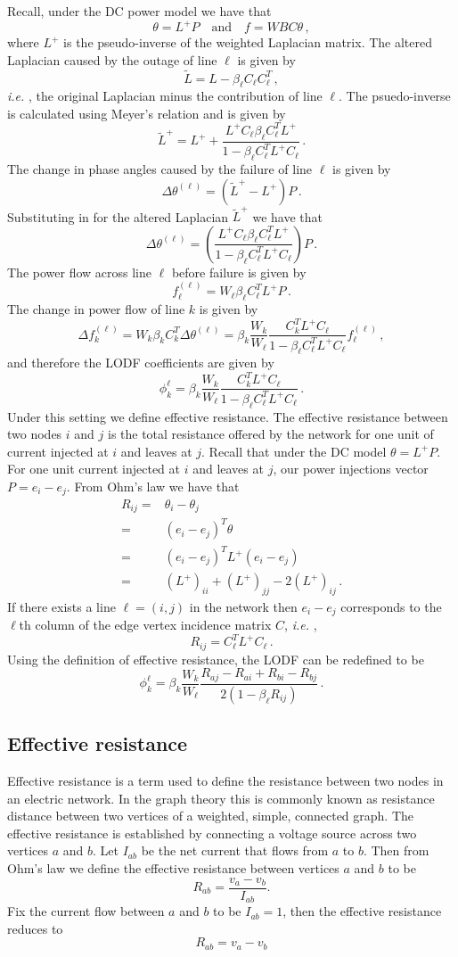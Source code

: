 \documentclass{article}
\newcommand{\ie}{\textit{i.e. }}
\renewcommand{\l}{\ell}
\renewcommand{\t}{\text}
\begin{document}
Recall, under the DC power model we have that 
\[\theta = L^+P\quad \t{and} \quad f = WBC\theta\,,\]
where $L^+$ is the pseudo-inverse of the weighted Laplacian matrix. The altered Laplacian caused by the outage of line $\l$ is given by
\[\tilde L = L - \beta_{\l}C_{\l}C_{\l}^T\,,\]
\ie, the original Laplacian minus the contribution of line $\l$.  The psuedo-inverse is calculated using Meyer's relation and is given by
\[\tilde L^+ = L^+ + \frac{L^+C_{\l}\beta_{\l}C_{\l}^TL^+}{1-\beta_{\l}C_{\l}^TL^+C_{\l}}\,.\]
The change in phase angles caused by the failure of line $\l$ is given by
\[\Delta \theta^{(\l)} = (\tilde L^+ - L^+)P\,.\]
Substituting in for the altered Laplacian $\tilde L^+$ we have that 
\[\Delta \theta^{(\l)} = \left(\frac{L^+C_{\l}\beta_{\l}C_{\l}^TL^+}{1-\beta_{\l}C_{\l}^TL^+C_{\l}}\right)P \,. \]
The power flow across line $\l$ before failure is given by
\[f_\l^{(\l)} = W_\l \beta_\l C_{\l}^TL^+P\,.\]
The change in power flow of line $k$ is given by 
\[\Delta f_k^{(\l)} = W_k \beta_k C_k^T \Delta \theta^{(\l)} = \beta_k \frac{W_k}{W_{\l}} \frac{C_k^TL^+C_{\l}}{1-\beta_\l C_{\l}^TL^+C_\l} f_\l ^{(\l)}\,,\]
and therefore the LODF coefficients are given by
\[\phi_k^{\l} = \beta_k \frac{W_k}{W_{\l}} \frac{C_k^TL^+C_{\l}}{1-\beta_\l C_{\l}^TL^+C_\l}\,.\]
Under this setting we define effective resistance. The effective resistance between two nodes $i$ and $j$ is the total  resistance offered by the network for one unit of current injected at $i$ and leaves at $j$. Recall that under the DC model $\theta = L^+P$. For one unit current injected at $i$ and leaves at $j$, our power injections vector $P = e_i-e_j$. From Ohm's law we have that
\[\begin{aligned} R_{ij} =& \theta_i-\theta_j\\
=& (e_i-e_j)^T\theta\\
=& (e_i-e_j)^TL^+(e_i-e_j)\\
=& (L^+)_{ii} + (L^+)_{jj} -2(L^+)_{ij}\,.
\end{aligned}\]
If there exists a line $\l = (i,j)$ in the network then $e_i-e_j$ corresponds to the $\l$th column of the edge vertex incidence matrix $C$, \ie, 
\[R_{ij} =C_\l^TL^+C_\l\,.\] 
Using the definition of effective resistance, the LODF can be redefined to be
\[\phi_k^{\l} = \beta_k \frac{W_k}{W_{\l}} \frac{R_{aj}-R_{ai}+R_{bi}-R_{bj}}{2(1-\beta_\l R_{ij})}\,.\]

\subsection{Effective resistance}
Effective resistance is a term used to define the resistance between two nodes in an electric network. In the graph theory this is commonly known as resistance distance between two vertices of a weighted, simple, connected graph. The effective resistance is established by connecting a voltage source across two vertices $a$ and $b$. Let $I_{ab}$ be the net current that flows from $a$ to $b$. Then from Ohm's law we define the effective resistance between vertices $a$ and $b$ to be
\[R_{ab} = \frac{v_a-v_b}{I_{ab}}.\] 
Fix the current flow between $a$ and $b$ to be $I_{ab}=1$, then the effective resistance reduces to 
\[R_{ab} =v_a-v_b\]
 
\end{document}
